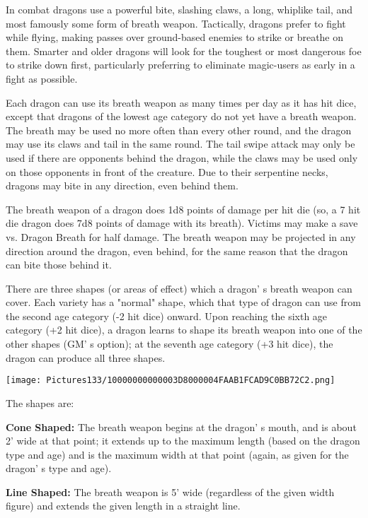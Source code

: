 \documentclass[a4paper,twoside,openany,10pt]{book}
\begin{document}
\begin{multicols}{2}
In combat dragons use a powerful bite, slashing claws, a long, whiplike tail, and most famously some form of breath weapon. Tactically, dragons prefer to fight while flying, making passes over ground-based enemies to strike or breathe on them. Smarter and older dragons will look for the toughest or most dangerous foe to strike down first, particularly preferring to eliminate magic-users as early in a fight as possible.

Each dragon can use its breath weapon as many times per day as it has hit dice, except that dragons of the lowest age category do not yet have a breath weapon. The breath may be used no more often than every other round, and the dragon may use its claws and tail in the same round. The tail swipe attack may only be used if there are opponents behind the dragon, while the claws may be used only on those opponents in front of the creature. Due to their serpentine necks, dragons may bite in any direction, even behind them.

The breath weapon of a dragon does 1d8 points of damage per hit die (so, a 7 hit die dragon does 7d8 points of damage with its breath). Victims may make a save vs. Dragon Breath for half damage. The breath weapon may be projected in any direction around the dragon, even behind, for the same reason that the dragon can bite those behind it.

There are three shapes (or areas of effect) which a dragon' s breath weapon can cover. Each variety has a "normal" shape, which that type of dragon can use from the second age category (-2 hit dice) onward. Upon reaching the sixth age category (+2 hit dice), a dragon learns to shape its breath weapon into one of the other shapes (GM' s option); at the seventh age category (+3 hit dice), the dragon can produce all three shapes.


\begin{center}
	\texttt{[image: Pictures133/10000000000003D8000004FAAB1FCAD9C0BB72C2.png]}
\end{center}\medskip

The shapes are:

\textbf{Cone Shaped:} The breath weapon begins at the dragon' s mouth, and is about 2' wide at that point; it extends up to the maximum length (based on the dragon type and age) and is the maximum width at that point (again, as given for the dragon' s type and age).

\textbf{Line Shaped: } The breath weapon is 5' wide (regardless of the given width figure) and extends the given length in a straight line.


\end{multicols}
\end{document}
